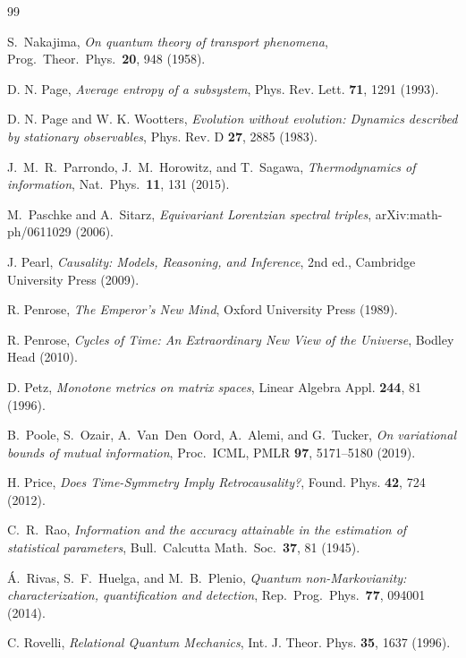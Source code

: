 \documentclass[12pt,a4paper,openany]{book}
\begin{document}
\begin{thebibliography}{99}

S.~Nakajima,
\emph{On quantum theory of transport phenomena},
Prog.\ Theor.\ Phys.\ \textbf{20}, 948 (1958).

D. N. Page, \emph{Average entropy of a subsystem}, Phys. Rev. Lett. \textbf{71}, 1291 (1993).

D. N. Page and W. K. Wootters, \emph{Evolution without evolution: Dynamics described by stationary observables}, Phys. Rev. D \textbf{27}, 2885 (1983).

J.~M.~R.~Parrondo, J.~M.~Horowitz, and T.~Sagawa, \emph{Thermodynamics of information}, Nat.\ Phys.\ \textbf{11}, 131 (2015).

M.~Paschke and A.~Sitarz, \emph{Equivariant Lorentzian spectral triples}, arXiv:math-ph/0611029 (2006).

J. Pearl, \emph{Causality: Models, Reasoning, and Inference}, 2nd ed., Cambridge University Press (2009).

R. Penrose, \emph{The Emperor's New Mind}, Oxford University Press (1989).

R. Penrose, \emph{Cycles of Time: An Extraordinary New View of the Universe}, Bodley Head (2010).

D. Petz, \emph{Monotone metrics on matrix spaces}, Linear Algebra Appl. \textbf{244}, 81 (1996).

B.~Poole, S.~Ozair, A.~Van~Den~Oord, A.~Alemi, and G.~Tucker,
\emph{On variational bounds of mutual information},
Proc.\ ICML, PMLR \textbf{97}, 5171--5180 (2019).

H. Price, \emph{Does Time-Symmetry Imply Retrocausality?}, Found. Phys. \textbf{42}, 724 (2012).

C.~R.~Rao,
\emph{Information and the accuracy attainable in the
estimation of statistical parameters},
Bull.\ Calcutta Math.\ Soc.\ \textbf{37}, 81 (1945).

\'{A}.~Rivas, S.~F.~Huelga, and M.~B.~Plenio,
\emph{Quantum non-Markovianity: characterization, quantification and detection},
Rep.\ Prog.\ Phys.\ \textbf{77}, 094001 (2014).

C. Rovelli, \emph{Relational Quantum Mechanics}, Int. J. Theor. Phys. \textbf{35}, 1637 (1996).


\end{thebibliography}
\end{document}
